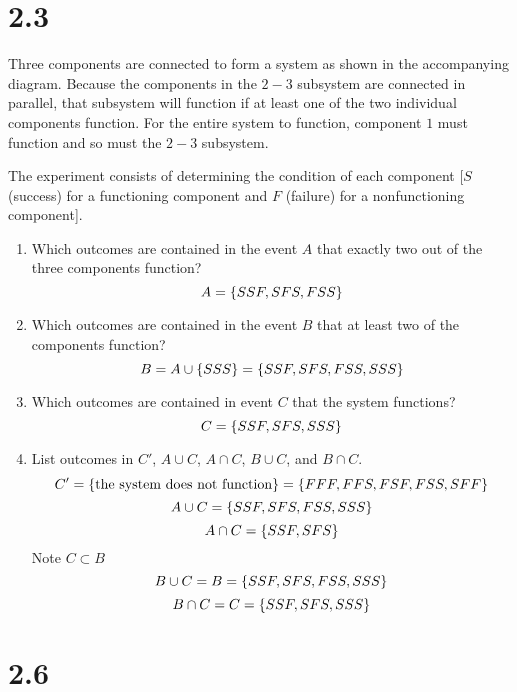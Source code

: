 \documentclass[letterpaper,12pt,fleqn]{article}
\begin{document}
\section*{2.3}

Three components are connected to form a system as shown in the accompanying diagram.  Because the components in the \(2-3\)
subsystem are connected in parallel, that subsystem will function if at least one of the two individual components function.
For the entire system to function, component \(1\) must function and so must the \(2-3\) subsystem.


The experiment consists of determining the condition of each component [\(S\) (success) for a functioning component and
  \(F\) (failure) for a nonfunctioning component].
\begin{enumerate}[label=\alph*)]
\item Which outcomes are contained in the event \(A\) that exactly two out of the three components function?
  \[A=\{SSF,SFS,FSS\}\]
\item Which outcomes are contained in the event \(B\) that at least two of the components function?
  \[B=A\cup\{SSS\}=\{SSF,SFS,FSS,SSS\}\]
\item Which outcomes are contained in event \(C\) that the system functions?
  \[C=\{SSF,SFS,SSS\}\]
\item List outcomes in \(C'\), \(A\cup C\), \(A\cap C\), \(B\cup C\), and \(B\cap C\).
  \[C'=\{\text{the system does not function}\}=\{FFF,FFS,FSF,FSS,SFF\}\]
  \[A\cup C=\{SSF,SFS,FSS,SSS\}\]
  \[A\cap C=\{SSF,SFS\}\]
  Note \(C\subset B\)
  \[B\cup C=B=\{SSF,SFS,FSS,SSS\}\]
  \[B\cap C=C=\{SSF,SFS,SSS\}\]
\end{enumerate}

\bigskip

\section*{2.6}
\end{document}

